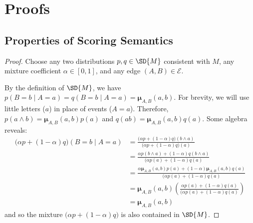 \documentclass{article}
\theoremstyle{plain}
\theoremstyle{definition}
\theoremstyle{remark}
\newcommand{\bmu}{\boldsymbol{\mu}}
\newcommand{\Ed}{\mathcal E}
\numberwithin{equation}{section}
\begin{document}
	\section{Proofs}
	\subsection{Properties of Scoring Semantics}
\begin{vfull}
		\thmsetconvex*
		\begin{proof}
			Choose any two distributions $p, q \in \SD{M}$ consistent with $M$, any mixture coefficient $\alpha \in [0,1]$, and any edge $(A,B) \in \Ed$.
			
			By the definition of $\SD{M}$, we have $p(B = b \mid A = a) = q(B = b \mid A = a) = \bmu_{A,B}(a,b)$.  
			For brevity, we will use little letters ($a$) in place of events ($A = a$).
			Therefore, $p(a\land b) = \bmu_{A,B}(a,b) p(a)$ and $q(ab) = \bmu_{A,B}(a,b) q(a)$. Some algebra reveals:
			\begin{align*}
				\Big( \alpha p + (1-\alpha) q \Big) (B = b \mid A = a) &= 
				\frac{\Big( \alpha p + (1-\alpha) q \Big) (b \land a)}{\Big( \alpha p + (1-\alpha) q \Big) (a)} \\
				&= \frac{ \alpha p(b \land a) + (1-\alpha) q(b \land a) }{\Big( \alpha p(a) + (1-\alpha) q (a)} \\
				&= \frac{ \alpha \bmu_{A,B}(a,b) p(a) + (1-\alpha) \bmu_{A,B}(a,b) q(a) }{\Big( \alpha p(a) + (1-\alpha) q (a)} \\
				&=\bmu_{A,B}(a,b) \left(\frac{ \alpha  p(a) + (1-\alpha) q(a) }{\Big( \alpha p(a) + (1-\alpha) q (a)}\right)\\
				&= \bmu_{A,B}(a,b)
			\end{align*}
			and so the mixture $\Big(\alpha p + (1-\alpha) q \Big)$ is also contained in $\SD{M}$.
		\end{proof}
\end{vfull}
		
\end{document}

